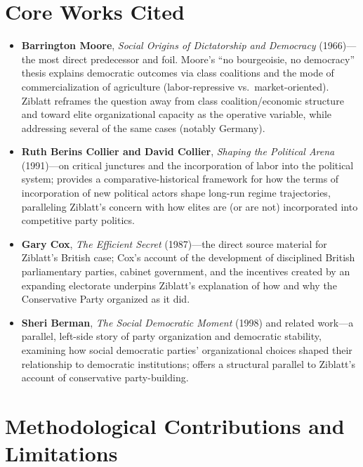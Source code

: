 \documentclass[12pt]{article}
\begin{document}
\section{Core Works Cited}

\begin{itemize}[leftmargin=*, itemsep=4pt]
    \item \textbf{Barrington Moore}, \textit{Social Origins of Dictatorship and Democracy} (1966)---the most direct predecessor and foil. Moore's ``no bourgeoisie, no democracy'' thesis explains democratic outcomes via class coalitions and the mode of commercialization of agriculture (labor-repressive vs.\ market-oriented). Ziblatt reframes the question away from class coalition/economic structure and toward elite organizational capacity as the operative variable, while addressing several of the same cases (notably Germany).
    \item \textbf{Ruth Berins Collier and David Collier}, \textit{Shaping the Political Arena} (1991)---on critical junctures and the incorporation of labor into the political system; provides a comparative-historical framework for how the terms of incorporation of new political actors shape long-run regime trajectories, paralleling Ziblatt's concern with how elites are (or are not) incorporated into competitive party politics.
    \item \textbf{Gary Cox}, \textit{The Efficient Secret} (1987)---the direct source material for Ziblatt's British case; Cox's account of the development of disciplined British parliamentary parties, cabinet government, and the incentives created by an expanding electorate underpins Ziblatt's explanation of how and why the Conservative Party organized as it did.
    \item \textbf{Sheri Berman}, \textit{The Social Democratic Moment} (1998) and related work---a parallel, left-side story of party organization and democratic stability, examining how social democratic parties' organizational choices shaped their relationship to democratic institutions; offers a structural parallel to Ziblatt's account of conservative party-building.
\end{itemize}

\section{Methodological Contributions and Limitations}
\end{document}
